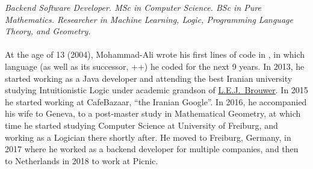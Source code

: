 \documentclass[10pt,a4paper]{article}
\begin{document}
\vspace{-1.3em}  %
\begin{multicols}{2}  %
\noindent \emph{%
Backend Software Developer.
MSc in Computer Science. BSc in Pure Mathematics. Researcher in Machine Learning, Logic, Programming Language Theory, and Geometry.}
\\
\\
At the age of 13 (2004), Mohammad-Ali wrote his first lines of code in , in which language (as well as its successor, ++) he coded for the next 9 years. In 2013, he started working as a Java developer and attending the best Iranian university studying Intuitionistic Logic under academic grandson of \href{https://en.wikipedia.org/wiki/L._E._J._Brouwer}{L.E.J.~Brouwer}. In 2015 he started working at CafeBazaar, ``the Iranian Google''.
In 2016, he accompanied his wife to Geneva, to a post-master study in Mathematical Geometry, at which time he started studying Computer Science at University of Freiburg, and working as a Logician there shortly after. He moved to Freiburg, Germany, in 2017 where he worked as a backend developer for multiple companies, and then to Netherlands in 2018 to work at Picnic.



\end{multicols}
\end{document}
